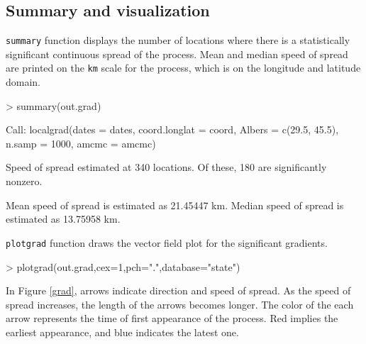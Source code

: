 \documentclass{article}
\newcommand{\code}[1]{{\tt #1}}
\begin{document}
\subsection{Summary and visualization}

\code{summary} function displays the number of locations where there is a statistically significant continuous spread of the process. Mean and median speed of spread are printed on the {\tt km} scale for the process, which is on the longitude and latitude domain.
\begin{Schunk}
\begin{Sinput}
> summary(out.grad)
\end{Sinput}
\begin{Soutput}
Call:
 localgrad(dates = dates, coord.longlat = coord, Albers = c(29.5, 45.5), n.samp = 1000, amcmc = amcmc)

Speed of spread estimated at 340 locations.
 Of these, 180 are significantly nonzero.


Mean speed of spread is estimated as 21.45447 km.
 Median speed of spread is estimated as 13.75958 km.
\end{Soutput}
\end{Schunk}
\code{plotgrad} function draws the vector field plot for the significant gradients.
\begin{Schunk}
\begin{Sinput}
> plotgrad(out.grad,cex=1,pch=".",database="state")
\end{Sinput}
\end{Schunk}
In Figure \ref{grad}, arrows indicate direction and speed of spread. As the speed of spread increases, the length of the arrows becomes longer. The color of the each arrow represents the time of first appearance of the process. Red implies the earliest appearance, and blue indicates the latest one.
\end{document}
